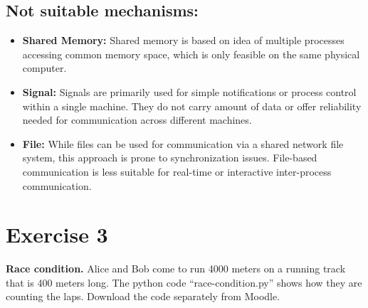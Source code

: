 \documentclass{article}
\newcommand{\exercise}[1]{
    \section*{Exercise #1}
    \markboth{Exercise #1}{}
}
\begin{document}
\subsection*{Not suitable mechanisms:}

\begin{itemize}
    \item \textbf{Shared Memory:} Shared memory is based on idea
    of multiple processes accessing common memory space, which is
    only feasible on the same physical computer.
    \item \textbf{Signal:} Signals are primarily used for simple
    notifications or process control within a single machine.
    They do not carry amount of data or offer reliability needed
    for communication across different machines.
    \item \textbf{File:} While files can be used for communication
    via a shared network file system, this approach is prone
    to synchronization issues. File-based communication is less
    suitable for real-time or interactive inter-process communication.
\end{itemize}




\newpage

\exercise{3}
\textbf{Race condition.} Alice and Bob come to run 4000 meters on a running track that is 400 meters
long. The python code “race-condition.py” shows how they are counting the laps. Download the
code separately from Moodle.
\end{document}

